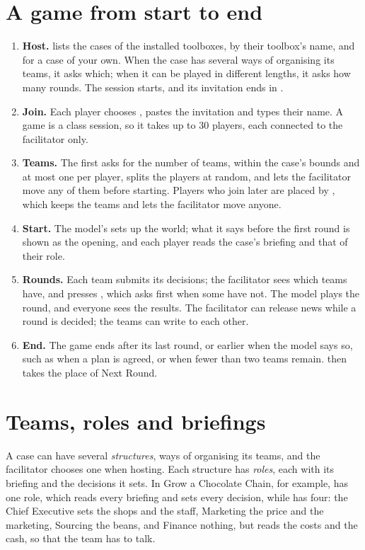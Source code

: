 \section{A game from start to end}\label{sec:game}
\begin{enumerate}
  \item \textbf{Host.}  lists the cases of the installed toolboxes, by their toolbox's name, and
     for a case of your own. When the case has several ways of organising its teams,
    it asks which; when it can be played in different lengths, it asks how many rounds. The session starts, and
    its invitation ends in .
  \item \textbf{Join.} Each player chooses , pastes the invitation and types their name. A game
    is a class session, so it takes up to 30 players, each connected to the facilitator only.
  \item \textbf{Teams.} The first  asks for the number of teams, within the case's bounds and at most
    one per player, splits the players at random, and lets the facilitator move any of them before starting.
    Players who join later are placed by , which keeps the teams
    and lets the facilitator move anyone.
  \item \textbf{Start.} The model's  sets up the world; what it says before the first round is shown
    as the opening, and each player reads the case's briefing and that of their role.
  \item \textbf{Rounds.} Each team submits its decisions; the facilitator sees which teams have, and presses
    , which asks first when some have not. The model plays the round, and everyone sees the
    results. The facilitator can release news while a round is decided; the teams can write to each other.
  \item \textbf{End.} The game ends after its last round, or earlier when the model says so, such as when a plan is
    agreed, or when fewer than two teams remain.  then takes the place of Next Round.
\end{enumerate}

\section{Teams, roles and briefings}\label{sec:roles}
A case can have several \emph{structures}, ways of organising its teams, and the facilitator chooses one when
hosting. Each structure has \emph{roles}, each with its briefing and the decisions it sets. In Grow a Chocolate
Chain, for example,  has one role, which reads every briefing and sets every decision, while
 has four: the Chief Executive sets the shops and the staff, Marketing the price and the marketing,
Sourcing the beans, and Finance nothing, but reads the costs and the cash, so that the team has to talk.

